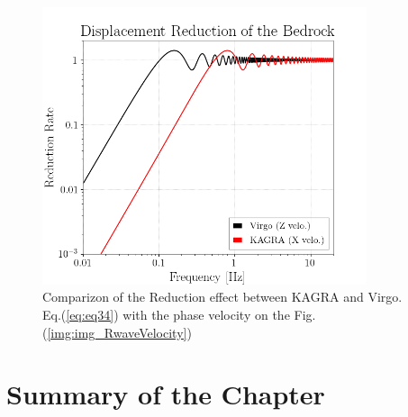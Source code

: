 \documentclass[a4paper,12pt]{book}
\begin{document}
\begin{figure}[H]
  \begin{center}
    \includegraphics[width=9.5cm]{./img_CDMR.png}
  \end{center}
  \caption{Comparizon of the Reduction effect between KAGRA and Virgo. Eq.(\ref{eq:eq34}) with the phase velocity on the Fig.(\ref{img:img_RwaveVelocity})}
  \label{img:img_dmrr}
\end{figure}


\section{Summary of the Chapter}

\appendix


\end{document}
